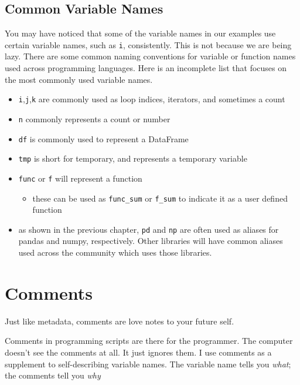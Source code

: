 \documentclass[
]{book}
\providecommand{\tightlist}{%
  \setlength{\itemsep}{0pt}\setlength{\parskip}{0pt}}
\begin{document}
\subsection{Common Variable Names}\label{common-variable-names}

You may have noticed that some of the variable names in our examples use certain
variable names, such as \texttt{i}, consistently. This is not because we are being
lazy. There are some common naming conventions for variable
or function names used across programming languages. Here is an incomplete list
that focuses on the most commonly used variable names.

\begin{itemize}
\tightlist
\item
  \texttt{i},\texttt{j},\texttt{k} are commonly used as loop indices, iterators, and sometimes a count
\item
  \texttt{n} commonly represents a count or number
\item
  \texttt{df} is commonly used to represent a DataFrame
\item
  \texttt{tmp} is short for temporary, and represents a temporary variable
\item
  \texttt{func} or \texttt{f} will represent a function

  \begin{itemize}
  \tightlist
  \item
    these can be used as \texttt{func\_sum} or \texttt{f\_sum} to indicate it as a user defined function
  \end{itemize}
\item
  as shown in the previous chapter, \texttt{pd} and \texttt{np} are often used as aliases for
  pandas and numpy, respectively. Other libraries will have common aliases used across
  the community which uses those libraries.
\end{itemize}

\section{Comments}\label{comments}

Just like metadata, comments are love notes to your future self.

Comments in programming scripts are there for the programmer. The computer doesn't see the comments at all. It just ignores them. I use comments as a supplement to self-describing variable names. The variable name tells you \emph{what}; the comments tell you \emph{why}
\end{document}
